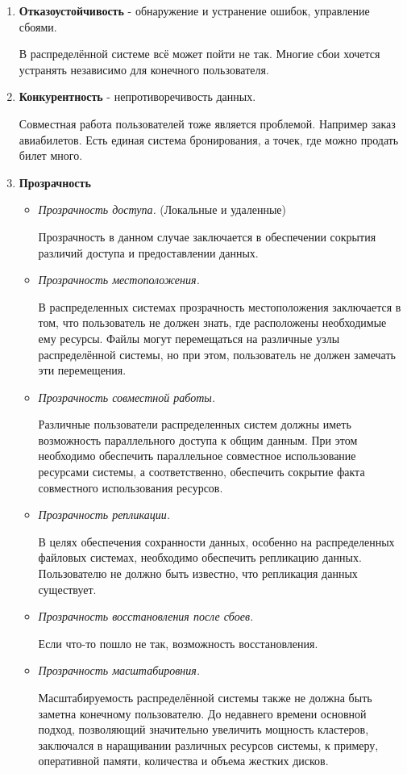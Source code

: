 \begin{enumerate}
\item
\textbf{ Отказоустойчивость} - обнаружение и устранение ошибок, управление сбоями.

В распределённой системе всё может пойти не так.
Многие сбои хочется устранять независимо для конечного пользователя.

\item
\textbf{ Конкурентность} - непротиворечивость данных.

Совместная работа пользователей тоже является проблемой.
Например заказ авиабилетов. Есть единая система бронирования, а точек, где можно продать билет много.

\item
\textbf{ Прозрачность}

\begin{itemize}
\item
\textit{ Прозрачность доступа.} (Локальные и удаленные)

Прозрачность в данном случае заключается в обеспечении сокрытия различий доступа и предоставлении данных.

\item
\textit{ Прозрачность местоположения. }

В распределенных системах прозрачность местоположения заключается в том, что пользователь не должен знать, где расположены необходимые ему ресурсы. 
Файлы могут перемещаться на различные узлы распределённой системы, но при этом, пользователь не должен замечать эти перемещения.

\item
\textit{ Прозрачность совместной работы.}

Различные пользователи распределенных систем должны иметь возможность параллельного доступа к общим данным. При этом необходимо обеспечить параллельное совместное использование ресурсами системы, а соответственно, обеспечить сокрытие факта совместного использования ресурсов.

\item
\textit{ Прозрачность репликации. }

В целях обеспечения сохранности данных, особенно на распределенных файловых системах, необходимо обеспечить репликацию данных. Пользователю не должно быть известно, что репликация данных существует.

\item
\textit{ Прозрачность восстановления после сбоев.}

Если что-то пошло не так, возможность восстановления.

\item
\textit{ Прозрачность масштабировния.}

Масштабируемость распределённой системы также не должна быть заметна конечному пользователю. До недавнего времени основной подход, позволяющий значительно увеличить мощность кластеров, заключался в наращивании различных ресурсов системы, к примеру, оперативной памяти, количества и объема жестких дисков. 
\end{itemize}

\end{enumerate}
